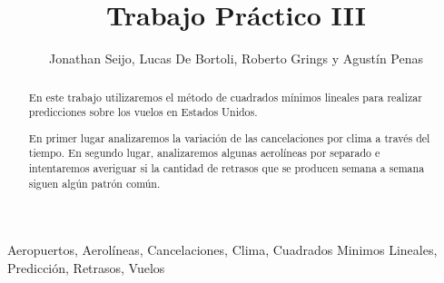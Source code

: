 \documentclass{endm}
\begin{document}
\setlength{\abovedisplayskip}{1cm}
\setlength{\belowdisplayskip}{1cm}

\begin{frontmatter}


\title{Trabajo Práctico III}

\author{Jonathan Seijo, Lucas De Bortoli, Roberto Grings y Agustín Penas}
\address{Departamento de computación\\ Universidad de Buenos Aires\\ Buenos Aires, Argentina\\}


\begin{abstract}

En este trabajo utilizaremos el método de cuadrados mínimos lineales para realizar predicciones sobre los vuelos en Estados Unidos.

En primer lugar analizaremos la variación de las cancelaciones por clima a través del tiempo. En segundo lugar, analizaremos algunas aerolíneas por separado e intentaremos averiguar si la cantidad de retrasos que se producen semana a semana siguen algún patrón común.
\end{abstract}

\begin{keyword}
Aeropuertos, Aerolíneas, Cancelaciones, Clima, Cuadrados Minimos Lineales, Predicción, Retrasos, Vuelos
\end{keyword}

\end{frontmatter}

\newpage



\end{document}
